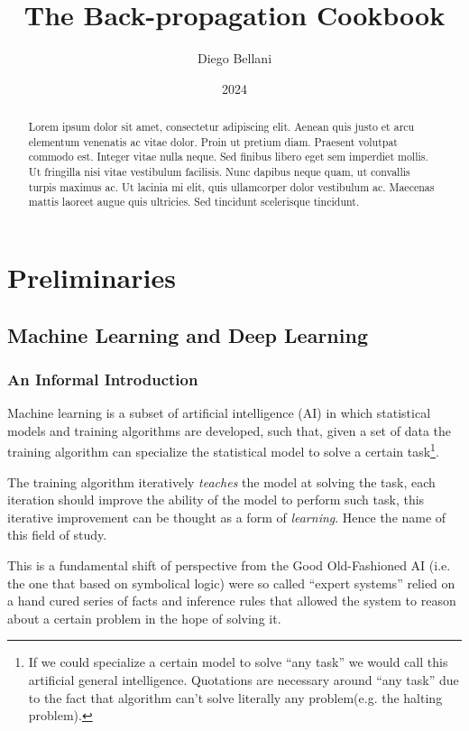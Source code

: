 \documentclass{report}
\title{The Back-propagation Cookbook}
\author{Diego Bellani}
\date{2024}
\begin{document}
\maketitle
\tableofcontents

\begin{abstract}
Lorem ipsum dolor sit amet, consectetur adipiscing elit. Aenean
quis justo et arcu elementum venenatis ac vitae dolor. Proin ut pretium diam.
Praesent volutpat commodo est. Integer vitae nulla neque. Sed finibus libero
eget sem imperdiet mollis. Ut fringilla nisi vitae vestibulum facilisis. Nunc
dapibus neque quam, ut convallis turpis maximus ac. Ut lacinia mi elit, quis
ullamcorper dolor vestibulum ac. Maecenas mattis laoreet augue quis ultricies.
Sed tincidunt scelerisque tincidunt.
\end{abstract}

\part{Preliminaries}

\chapter{Machine Learning and Deep Learning}

\section{An Informal Introduction}

Machine learning is a subset of artificial intelligence (AI) in which
statistical models and training algorithms are developed, such that, given a
set of data the training algorithm can specialize the statistical model to
solve a certain task\footnote{If we could specialize a certain model to solve
``any task'' we would call this artificial general intelligence. Quotations are
necessary around ``any task'' due to the fact that algorithm can't solve
literally any problem(e.g. the halting problem).}.

The training algorithm iteratively \emph{teaches} the model at solving the task,
each iteration should improve the ability of the model to perform such task,
this iterative improvement can be thought as a form of \emph{learning}. Hence
the name of this field of study.

This is a fundamental shift of perspective from the Good Old-Fashioned AI
(i.e. the one that based on symbolical logic) were so called ``expert systems''
relied on a hand cured series of facts and inference rules that allowed the
system to reason about a certain problem in the hope of solving it.
\end{document}
